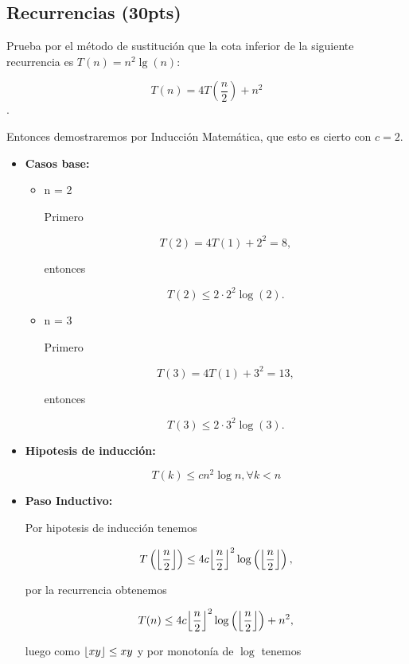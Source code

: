 \documentclass[answers,11pt]{exam}
\DeclarePairedDelimiter\floor{\lfloor}{\rfloor}
\begin{document}
\begin{questions}
\section*{\sf Recurrencias (30pts) } 

\question
Prueba por el m\'etodo de sustituci\'on que la cota inferior de la siguiente recurrencia es $T(n) = n^2\lg(n)$:

$$ T(n) = 4T ( \frac{n}{2} ) + n^2$$.

Entonces demostraremos por Inducción Matemática, que esto es cierto con $c = 2$.

\begin{itemize}
    \item \textbf{Casos base:}

        \begin{itemize}
            \item n = 2
            
            Primero

            \[T(2) = 4T(1) + 2^2 = 8,\]

            entonces

            \[T(2) \leq 2\cdot2^2\log(2).\]
            
            \item n = 3
            
            Primero
            
            \[T(3) = 4T(1) + 3^2 = 13,\]

            entonces

            \[T(3) \leq 2\cdot3^2\log(3).\]

        \end{itemize}

    \item \textbf{Hipotesis de inducción:}
    
    \[T(k) \leq cn^2\log n, \forall k < n\]

    \item \textbf{Paso Inductivo:}
    
    Por hipotesis de inducción tenemos

    \[T\left(\floor*{\frac{n}{2}}\right)\leq 4c\floor*{\frac{n}{2}}^2\log\left(\floor*{\frac{n}{2}}\right),\]

    por la recurrencia obtenemos

    \[T(n) \leq 4c\floor*{\frac{n}{2}}^2\log\left(\floor*{\frac{n}{2}}\right) + n^2,\]

    luego como $\floor*{xy} \leq xy$ y por monotonía de $\log$ tenemos


\end{itemize}
\end{questions}
\end{document}
